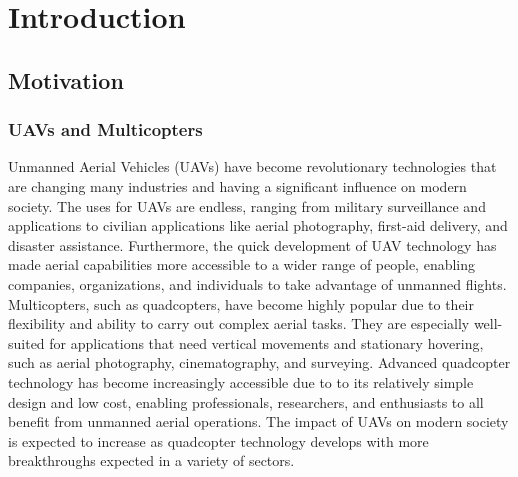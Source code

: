 \chapter{Introduction}
    \section{Motivation}
    \subsection{UAVs and Multicopters}
    Unmanned Aerial Vehicles (UAVs) have become revolutionary technologies that are changing many industries and having a significant influence on modern society. The uses for UAVs are endless, ranging from military surveillance and applications to civilian applications like aerial photography, first-aid delivery, and disaster assistance. Furthermore, the quick development of UAV technology has made aerial capabilities more accessible to a wider range of people, enabling companies, organizations, and individuals to take advantage of unmanned flights.\\
    
    Multicopters, such as quadcopters, have become highly popular due to their flexibility and ability to carry out complex aerial tasks. They are especially well-suited for applications that need vertical movements and stationary hovering, such as aerial photography, cinematography, and surveying. Advanced quadcopter technology has become increasingly accessible due to to its relatively simple design and low cost, enabling professionals, researchers, and enthusiasts to all benefit from unmanned aerial operations. The impact of UAVs on modern society is expected to increase as quadcopter technology develops with more breakthroughs expected in a variety of sectors.
